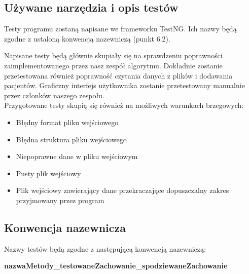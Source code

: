 \documentclass{article}
\begin{document}
    \subsection{Używane narzędzia i opis testów}
    
        Testy programu zostaną napisane we frameworku TestNG. Ich nazwy będą zgodne z ustaloną konwencją nazewniczą (punkt 6.2).
        
        \vspace{4mm}
        Napisane testy będą głównie skupiały się na sprawdzeniu poprawności zaimplementowanego przez nasz zespół algorytmu. Dokładnie zostanie przetestowana również poprawność czytania danych z plików i dodawania pacjentów. Graficzny interfejs użytkownika zostanie przetestowany manualnie przez członków naszego zespołu.\\
        Przygotowane testy skupią się również na możliwych warunkach brzegowych:
        
        \begin{itemize}
            \item Błędny format pliku wejściowego
            \item Błędna struktura pliku wejściowego
            \item Niepoprawne dane w pliku wejściowym
            \item Pusty plik wejściowy
            \item Plik wejściowy zawierający dane przekraczające dopuszczalny zakres\\ przyjmowany przez program
        \end{itemize}
    
        \subsection{Konwencja nazewnicza}
        
        Nazwy testów będą zgodne z następującą konwencją nazewniczą:
        
        \vspace{2mm}
        
        \textbf{nazwaMetody\_testowaneZachowanie\_spodziewaneZachowanie}
\end{document}

